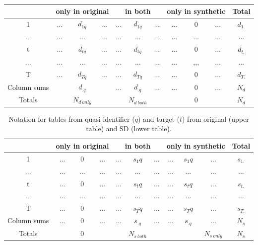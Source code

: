 \documentclass[12pt]{article}
\begin{document}
\begin{center}
\begin{table}[ht]
\begin{tabular}{ c|ccc|ccc|ccc|c} 
 & \multicolumn{3}{|c|}{only in original} & \multicolumn{3}{|c|}{in both} & \multicolumn{3}{|c|}{only in synthetic} & Total\\
 \hline
1  & ... & $d_{1q}$ & ...  & ... & $d_{1q}$ & ...  & ... & 0 & ... & $d_{1.}$ \\
 ... & ... & ... & ...  & ... & ... & ...  & ... & ... & ... & ... \\
t  & ... & $d_{tq}$  & ...  & ... & $d_{tq}$ & ...  & ... & 0 & ... & $d_{t.}$ \\
... & ... & ... & ...  & ... & ... & ...  & ... & ,,, & ... & ... \\
T  & ... & $d_{Tq}$ & ...  & ... & $d_{Tq}$ & ...  & ... & 0 & ... & $d_{T.}$ \\
 \hline
Column sums  & & $d_{.q}$ &  & ... & $d_{.q}$ & ...  & ... & 0 & ... & $N_d$ \\
 \hline
Totals  &  & $N_{d\:only}$ &  & & $N_{d~both}$ &  & & 0 &  & $N_d$ \\
\end{tabular}
\end{table}
\begin{table}[ht]
\begin{tabular}{ c|ccc|ccc|ccc|c} 
 & \multicolumn{3}{|c|}{only in original} & \multicolumn{3}{|c|}{in both} & \multicolumn{3}{|c|}{only in synthetic} & Total\\
 \hline
1  & ... & 0 & ...  & ... & $s_1q$ & ...  & ... & $s_1q$ & ... & $s_{1.}$ \\
 ... & ... & ... & ...  & ... & ... & ...  & ... & ... & ... & ... \\
t  & ... & 0 & ...  & ... & $s_tq$ & ...  & ... & $s_tq$ & ... & $s_{t.}$ \\
... & ... & ... & ...  & ... & ... & ...  & ... & ... & ... & ... \\
T  & ... & 0 & ...  & ... & $s_Tq$ & ...  & ... & $s_Tq$ & ... & $s_{T.}$ \\
 \hline
Column sums  & ... & 0 & ...  & ... & $s_{.q}$ & ...  & ... & $s_{.q}$ & ... & $N_s$ \\
 \hline
Totals  &  & 0 &  & & $N_{s~both}$ &  &  &  & $N_{s\:only}$ & $N_s$ \\

\end{tabular}
\caption{Notation for tables from quasi-identifier ($q$) and target ($t$) from original (upper table) and SD (lower table).}
\label{table:2}
\end{table}
\end{center}
\end{document}
